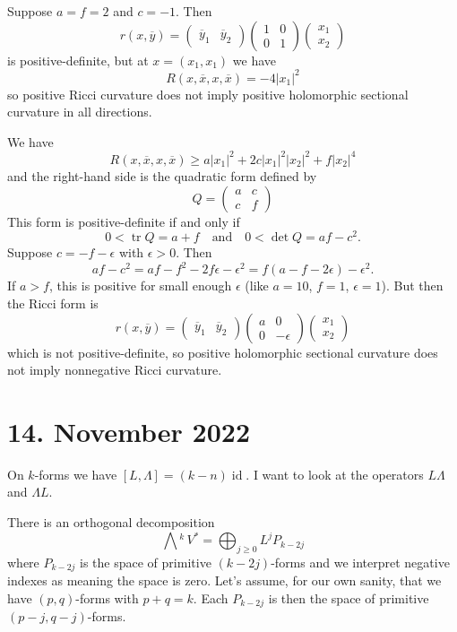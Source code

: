 \documentclass[11pt]{amsart}
\theoremstyle{definition}
\def\qandq{\quad\text{and}\quad}
\def\ov#1{\overline{#1}}
\DeclareMathOperator{\id}{id}
\DeclareMathOperator{\tr}{tr}
\newcommand{\ext}[1]{\bigwedge{}^{\!\!#1}\,}
\begin{document}
Suppose $a = f = 2$ and $c = -1$. Then
$$
r(x, \ov y) =
\begin{pmatrix}\ov y_1 & \ov y_2 \end{pmatrix}
\begin{pmatrix}
1 & 0 \\ 0 & 1
\end{pmatrix}
\begin{pmatrix} x_1 \\ x_2 \end{pmatrix}
$$
is positive-definite, but at $x = (x_1, x_1)$ we have
$$
R(x, \ov x, x, \ov x) = -4 |x_1|^2
$$
so positive Ricci curvature does not imply positive holomorphic sectional
curvature in all directions.

We have
$$
R(x, \ov x, x, \ov x)
\geq
a |x_1|^2 + 2c |x_1|^2 |x_2|^2 + f |x_2|^4
$$
and the right-hand side is the quadratic form defined by
$$
Q = \begin{pmatrix}
a & c \\ c & f
\end{pmatrix}
$$
This form is positive-definite if and only if
$$
0 < \tr Q = a + f
\qandq
0 < \det Q = af - c^2.
$$
Suppose $c = -f - \epsilon$ with $\epsilon > 0$.
Then
$$
af - c^2
= af - f^2 - 2f \epsilon - \epsilon^2
= f(a - f - 2\epsilon) - \epsilon^2.
$$
If $a > f$, this is positive for small enough $\epsilon$ (like $a = 10$, $f =
1$, $\epsilon = 1$).
But then the Ricci form is
$$
r(x, \ov y) =
\begin{pmatrix}\ov y_1 & \ov y_2 \end{pmatrix}
\begin{pmatrix}
a & 0 \\ 0 & -\epsilon
\end{pmatrix}
\begin{pmatrix} x_1 \\ x_2 \end{pmatrix}
$$
which is not positive-definite,
so positive holomorphic sectional curvature does not imply nonnegative Ricci
curvature.

\section{14. November 2022}

On $k$-forms we have $[L,\Lambda] = (k-n)\id$.
I want to look at the operators $L\Lambda$ and $\Lambda L$.

There is an orthogonal decomposition
$$
\ext{k}V^* = \bigoplus_{j \geq 0} L^{j} P_{k-2j}
$$
where $P_{k-2j}$ is the space of primitive $(k-2j)$-forms and we interpret
negative indexes as meaning the space is zero.
Let's assume, for our own sanity, that we have $(p,q)$-forms with $p+q = k$.
Each $P_{k-2j}$ is then the space of primitive $(p-j,q-j)$-forms.
\end{document}
